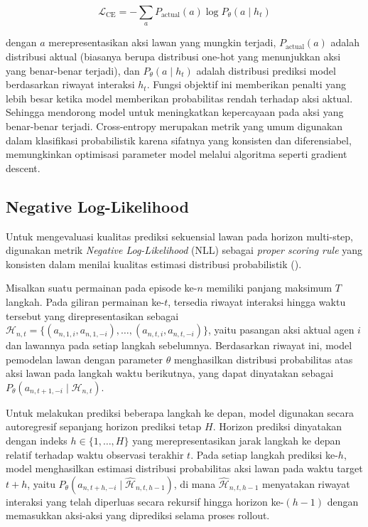 \begin{equation}\label{eq:ChrossEnthropy}
\mathcal{L}_{\text{CE}} = - \sum_{a} P_{\text{actual}}(a) \log P_\theta(a \mid h_t)
\end{equation}

dengan $a$ merepresentasikan aksi lawan yang mungkin terjadi, $P_{\text{actual}}(a)$ adalah distribusi aktual (biasanya berupa distribusi one-hot yang menunjukkan aksi yang benar-benar terjadi), dan $P_\theta(a \mid h_t)$ adalah distribusi prediksi model berdasarkan riwayat interaksi $h_t$. Fungsi objektif ini memberikan penalti yang lebih besar ketika model memberikan probabilitas rendah terhadap aksi aktual. Sehingga mendorong model untuk meningkatkan kepercayaan pada aksi yang benar-benar terjadi. Cross-entropy merupakan metrik yang umum digunakan dalam klasifikasi probabilistik karena sifatnya yang konsisten dan diferensiabel, memungkinkan optimisasi parameter model melalui algoritma seperti gradient descent.

\subsection{Negative Log-Likelihood}\label{sec:NLL}

Untuk mengevaluasi kualitas prediksi sekuensial lawan pada horizon multi-step, digunakan metrik \textit{Negative Log-Likelihood} (NLL) sebagai \textit{proper scoring rule} yang konsisten dalam menilai kualitas estimasi distribusi probabilistik (\cite{zhu_negative_2018}). 

Misalkan suatu permainan pada episode ke-$n$ memiliki panjang maksimum $T$ langkah. Pada giliran permainan ke-$t$, tersedia riwayat interaksi hingga waktu tersebut yang direpresentasikan sebagai $\mathcal{H}_{n,t} = \{(a_{n,1,i}, a_{n,1,-i}), \dots, (a_{n,t,i}, a_{n,t,-i})\}$, yaitu pasangan aksi aktual agen $i$ dan lawannya pada setiap langkah sebelumnya. Berdasarkan riwayat ini, model pemodelan lawan dengan parameter $\theta$ menghasilkan distribusi probabilitas atas aksi lawan pada langkah waktu berikutnya, yang dapat dinyatakan sebagai $P_\theta(a_{n,t+1,-i} \mid \mathcal{H}_{n,t})$.

Untuk melakukan prediksi beberapa langkah ke depan, model digunakan secara autoregresif sepanjang horizon prediksi tetap $H$. Horizon prediksi dinyatakan dengan indeks $h \in \{1,\dots,H\}$ yang merepresentasikan jarak langkah ke depan relatif terhadap waktu observasi terakhir $t$. Pada setiap langkah prediksi ke-$h$, model menghasilkan estimasi distribusi probabilitas aksi lawan pada waktu target $t+h$, yaitu $P_\theta(a_{n,t+h,-i} \mid \hat{\mathcal{H}}_{n,t,h-1})$, di mana $\hat{\mathcal{H}}_{n,t,h-1}$ menyatakan riwayat interaksi yang telah diperluas secara rekursif hingga horizon ke-$(h-1)$ dengan memasukkan aksi-aksi yang diprediksi selama proses rollout.

